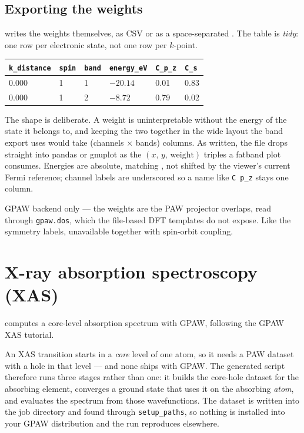 \subsection{Exporting the weights}
\label{sec:fatband-export}

 writes the weights themselves, as CSV or as a
space-separated . The table is \emph{tidy}: one row per
electronic state, not one row per $k$-point.

\begin{center}
\small
\begin{tabular}{@{}llllll@{}}
\toprule
\texttt{k\_distance} & \texttt{spin} & \texttt{band} &
\texttt{energy\_eV} & \texttt{C\_p\_z} & \texttt{C\_s} \\
\midrule
0.000 & 1 & 1 & $-20.14$ & 0.01 & 0.83 \\
0.000 & 1 & 2 & $-8.72$  & 0.79 & 0.02 \\
\bottomrule
\end{tabular}
\end{center}

The shape is deliberate. A weight is uninterpretable without the energy of
the state it belongs to, and keeping the two together in the wide layout the
band export uses would take (channels $\times$ bands) columns. As written,
the file drops straight into pandas or gnuplot as the
$(x,\,y,\,\text{weight})$ triples a fatband plot consumes. Energies are
absolute, matching , not shifted by the viewer's
current Fermi reference; channel labels are underscored so a name like
\texttt{C p\_z} stays one column.

\begin{calnote}
GPAW backend only --- the weights are the PAW projector overlaps, read through
\texttt{gpaw.dos}, which the file-based DFT templates do not expose. Like the
symmetry labels, unavailable together with spin-orbit coupling.
\end{calnote}

\section{X-ray absorption spectroscopy (XAS)}
\label{sec:xas}

\menusep{}
computes a core-level absorption spectrum with GPAW, following the GPAW XAS
tutorial.

An XAS transition starts in a \emph{core} level of one atom, so it needs a PAW
dataset with a hole in that level --- and none ships with GPAW. The generated
script therefore runs three stages rather than one: it builds the core-hole
dataset for the absorbing element, converges a ground state that uses it on the
absorbing \emph{atom}, and evaluates the spectrum from those wavefunctions. The
dataset is written into the job directory and found through
\texttt{setup\_paths}, so nothing is installed into your GPAW distribution and
the run reproduces elsewhere.

